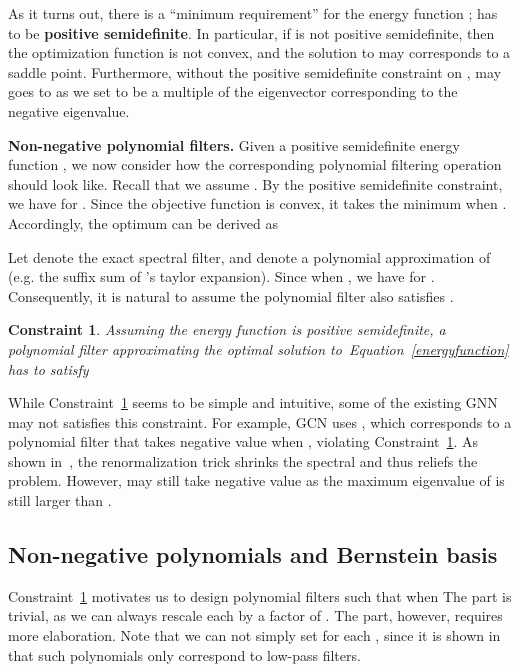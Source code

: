 \documentclass{article}
\newtheorem{constraint}{Constraint}[section]
\begin{document}
As it turns out, there is a ``minimum requirement'' for the energy function ;   has to be {\bf positive semidefinite}. In particular, if  is not positive semidefinite, then the optimization function  is not convex, and  the solution to
 may corresponds to a saddle point. 
Furthermore, without the positive semidefinite constraint on ,  may goes to  as we set  to be a multiple of the eigenvector corresponding to the negative eigenvalue. 

\textbf{Non-negative polynomial filters.}
Given a positive semidefinite energy function , we now consider how the corresponding polynomial filtering operation  should look like. 
Recall that we assume . By the positive semidefinite constraint, we have  for . Since the objective function  is convex, it takes the minimum when . Accordingly, the optimum  can be derived as 

Let   denote the exact spectral filter, and   denote a polynomial approximation  of  (e.g. the suffix sum of 's taylor expansion). Since  when , we have  for . Consequently, it is natural to assume the polynomial filter  also satisfies .
\begin{constraint}
\label{constraint}
Assuming the  energy function  is positive semidefinite, a polynomial filter  approximating the optimal solution to~Equation~\eqref{energyfunction} has to satisfy 

\end{constraint}



While Constraint~\ref{constraint} seems to be simple and intuitive, some of the existing GNN may not satisfies this constraint. For example, GCN uses , which corresponds to a polynomial filter  that takes negative value  when , violating Constraint~\ref{constraint}. As shown in~\cite{wu2019sgc}, the renormalization trick  shrinks the spectral and thus reliefs the problem. However,  may still take negative value as the maximum eigenvalue of  is still larger than . 

\subsection{Non-negative polynomials and Bernstein basis}
Constraint~\ref{constraint} motivates us to design polynomial filters  such that  when  The  part is trivial, as we can always rescale each  by a factor of . The   part, however, requires more elaboration. Note that we can not simply set  for each , since it is shown in~\cite{chien2021GPR-GNN} that such polynomials only correspond to  low-pass filters. 
\end{document}
